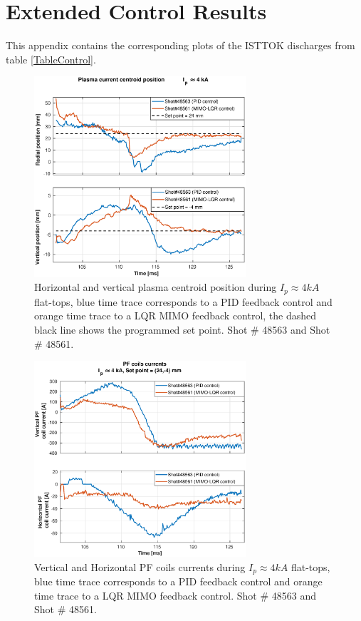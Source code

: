 \chapter{Extended Control Results }
\label{Control_Results}
This appendix contains the corresponding plots of the ISTTOK discharges from table \ref{TableControl}.

\begin{figure}[h]
	\centering
	\includegraphics[width=0.7\textwidth]{Chp5/PIDvsMIMO_563_561_2.eps}
	\caption{Horizontal and vertical plasma centroid position during  $I_p\approx 4kA$  flat-tops, blue time trace corresponds to a PID feedback control and orange time trace to a LQR MIMO feedback control, the dashed black line shows the programmed set point. Shot $\#$ 48563 and Shot $\#$ 48561.}
\end{figure}

\begin{figure}
	\centering
	\includegraphics[width=0.7\textwidth]{Chp5/PIDvsMIMO_563_561_curr_2.eps}
	\caption{  Vertical and Horizontal PF coils currents during  $I_p\approx 4kA$  flat-tops, blue time trace corresponds to a PID feedback control and orange time trace to a LQR MIMO feedback control. Shot $\#$ 48563 and Shot $\#$ 48561.}
\end{figure}

